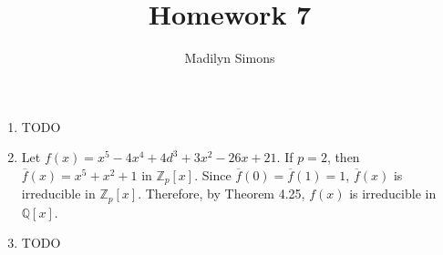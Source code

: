 \documentclass{article}
\title{Homework 7}
\author{Madilyn Simons}
\date{}
\begin{document}
\maketitle

\begin{enumerate}

\item TODO

\item Let $f(x) = x^5 - 4x^4 + 4d^3 + 3x^2 -26x + 21$.
If $p = 2$, then $\overline{f}(x) = x^5 + x^2 + 1$ in $\mathbb{Z}_{p}[x]$.
Since $\overline{f}(0) = \overline{f}(1) = 1$, $\overline{f}(x)$ is
irreducible in $\mathbb{Z}_{p}[x]$.  Therefore, by Theorem 4.25, $f(x)$ is
irreducible in $\mathbb{Q}[x]$.

\item TODO

\end{enumerate}
\end{document}

